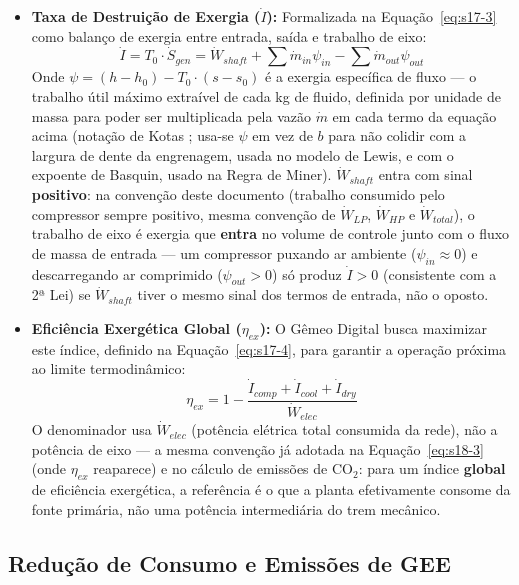\documentclass[12pt,a4paper]{article}
\numberwithin{equation}{section}
\numberwithin{table}{section}
\numberwithin{figure}{section}
\begin{document}
{\begin{itemize}
	\item \textbf{Taxa de Destruição de Exergia ($\dot{I}$):} Formalizada na Equação~\eqref{eq:s17-3} como balanço de exergia entre entrada, saída e trabalho de eixo:
	\begin{equation}\label{eq:s17-3}
\dot{I} = T_0 \cdotp \dot{S}_{gen} = \dot{W}_{shaft} + \sum \dot{m}_{in} \psi_{in} - \sum \dot{m}_{out} \psi_{out}
\end{equation}
	Onde $\psi = (h - h_0) - T_0 \cdotp (s - s_0)$ é a exergia específica de fluxo — o trabalho útil máximo extraível de cada kg de fluido, definida por unidade de massa para poder ser multiplicada pela vazão $\dot{m}$ em cada termo da equação acima (notação de Kotas \cite{bejan}; usa-se $\psi$ em vez de $b$ para não colidir com a largura de dente da engrenagem, usada no modelo de Lewis, e com o expoente de Basquin, usado na Regra de Miner). $\dot{W}_{shaft}$ entra com sinal \textbf{positivo}: na convenção deste documento (trabalho consumido pelo compressor sempre positivo, mesma convenção de $\dot{W}_{LP}$, $\dot{W}_{HP}$ e $\dot{W}_{total}$), o trabalho de eixo é exergia que \textbf{entra} no volume de controle junto com o fluxo de massa de entrada — um compressor puxando ar ambiente ($\psi_{in}\approx0$) e descarregando ar comprimido ($\psi_{out}>0$) só produz $\dot{I}>0$ (consistente com a 2ª Lei) se $\dot{W}_{shaft}$ tiver o mesmo sinal dos termos de entrada, não o oposto.
	
	\item \textbf{Eficiência Exergética Global ($\eta_{ex}$):}
	O Gêmeo Digital busca maximizar este índice, definido na Equação~\eqref{eq:s17-4}, para garantir a operação próxima ao limite termodinâmico:
	\begin{equation}\label{eq:s17-4}
\eta_{ex} = 1 - \frac{\dot{I}_{comp} + \dot{I}_{cool} + \dot{I}_{dry}}{\dot{W}_{elec}}
\end{equation}
	O denominador usa $\dot{W}_{elec}$ (potência elétrica total consumida da rede), não a potência de eixo — a mesma convenção já adotada na Equação~\eqref{eq:s18-3} (onde $\eta_{ex}$ reaparece) e no cálculo de emissões de CO$_2$: para um índice \textbf{global} de eficiência exergética, a referência é o que a planta efetivamente consome da fonte primária, não uma potência intermediária do trem mecânico.
\end{itemize}

\subsection{Redução de Consumo e Emissões de GEE}

}
\end{document}
